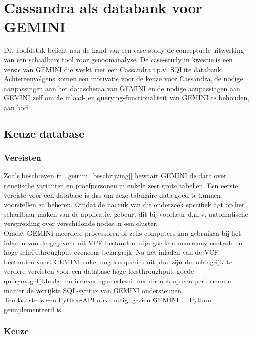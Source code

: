 \chapter{Cassandra als databank voor GEMINI}
\label{concept}

Dit hoofdstuk belicht aan de hand van een case-study de conceptuele uitwerking van een schaalbare tool voor genoomanalyse. De case-study in kwestie is een versie van GEMINI die werkt met een Cassandra i.p.v. SQLite databank. Achtereenvolgens komen een motivatie voor de keuze voor Cassandra, de nodige aanpassingen aan het dataschema van GEMINI en de nodige aanpassingen aan GEMINI zelf om de inlaad- en querying-functionaliteit van GEMINI te behouden, aan bod.

\section{Keuze database}

\subsection{Vereisten}

Zoals beschreven in [\ref{gemini_beschrijving}] bewaart GEMINI de data over genetische varianten en proefpersonen in enkele zeer grote tabellen. Een eerste vereiste voor een database is dus om deze tabulaire data goed te kunnen voorstellen en beheren. Omdat de nadruk van dit onderzoek specifiek ligt op het schaalbaar maken van de applicatie, gebeurt dit bij voorkeur d.m.v. automatische verspreiding over verschillende nodes in een cluster.\\
Omdat GEMINI meerdere processoren of zelfs computers kan gebruiken bij het inladen van de gegevens uit VCF-bestanden, zijn goede concurrency-controle en hoge schrijfthroughput eveneens belangrijk. Na het inladen van de VCF bestanden voert GEMINI enkel nog leesqueries uit, dus zijn de belangrijkste verdere vereisten voor een database hoge leesthroughput, goede querymogelijkheden en indexeringsmechanismes die ook op een performante manier de verrijkte SQL-syntax van GEMINI ondersteunen.
\\Ten laatste is een Python-API ook nuttig, gezien GEMINI in Python ge\"implementeerd is.

\subsection{Keuze}

